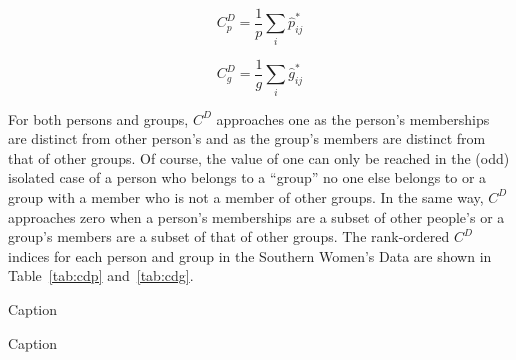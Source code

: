 \documentclass[a4paper,fleqn]{cas-sc}
\begin{document}
\begin{equation}
    C^{D}_p = \frac{1}{p}\sum_i \hat{p}_{ij}^*
\end{equation}

\begin{equation}
     C^{D}_g = \frac{1}{g}\sum_i \hat{g}_{ij}^*
\end{equation}

For both persons and groups, $C^{D}$ approaches one as the person's memberships are distinct from other person's and as the group's members are distinct from that of other groups. Of course, the value of one can only be reached in the (odd) isolated case of a person who belongs to a ``group'' no one else belongs to or a group with a member who is not a member of other groups. In the same way, $C^{D}$ approaches zero when a person's memberships are a subset of other people's or a group's members are a subset of that of other groups. The rank-ordered $C^D$ indices for each person and group in the Southern Women's Data are shown in Table~\ref{tab:cdp} and~\ref{tab:cdg}.

\begin{table}[]
    \centering
    
    \caption{Caption}
    \label{tab:cdp}
\end{table}

\begin{table}[]
    \centering
    
    \caption{Caption}
    \label{tab:cdg}
\end{table}


% 



\end{document}
